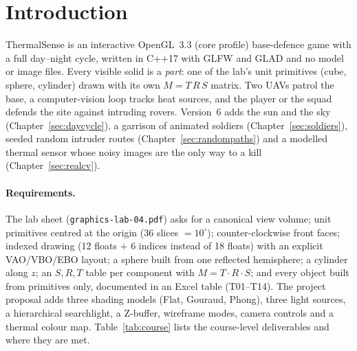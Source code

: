 \section{Introduction}\label{sec:intro}
ThermalSense is an interactive OpenGL~3.3 (core profile) base-defence game with a full day--night cycle, written in C++17 with GLFW and GLAD and no
model or image files. Every visible solid is a \emph{part}: one of the lab's unit primitives (cube, sphere, cylinder) drawn with its own
$M=T\,R\,S$ matrix. Two UAVs patrol the base, a computer-vision loop tracks heat sources, and the player or the squad defends the site against intruding rovers. Version~6 adds the sun and the sky (Chapter~\ref{sec:daycycle}), a garrison of \nSoldiers{} animated soldiers (Chapter~\ref{sec:soldiers}), seeded random intruder routes (Chapter~\ref{sec:randompaths}) and a modelled thermal sensor whose noisy images are the only way to a kill (Chapter~\ref{sec:realcv}).

\paragraph{Requirements.} The lab sheet (\texttt{graphics-lab-04.pdf}) asks for a canonical view volume; unit primitives centred at the origin
(36 slices $=10^\circ$); counter-clockwise front faces; indexed drawing (12 floats $+$ 6 indices instead of 18 floats) with an explicit VAO/VBO/EBO layout;
a sphere built from one reflected hemisphere; a cylinder along $z$; an $S,R,T$ table per component with $M=T\cdot R\cdot S$; and every object built from primitives only,
documented in an Excel table (T01--T14). The project proposal adds three shading models (Flat, Gouraud, Phong), three light sources, a hierarchical searchlight, a Z-buffer,
wireframe modes, camera controls and a thermal colour map. Table~\ref{tab:course} lists the course-level deliverables and where they are met.

